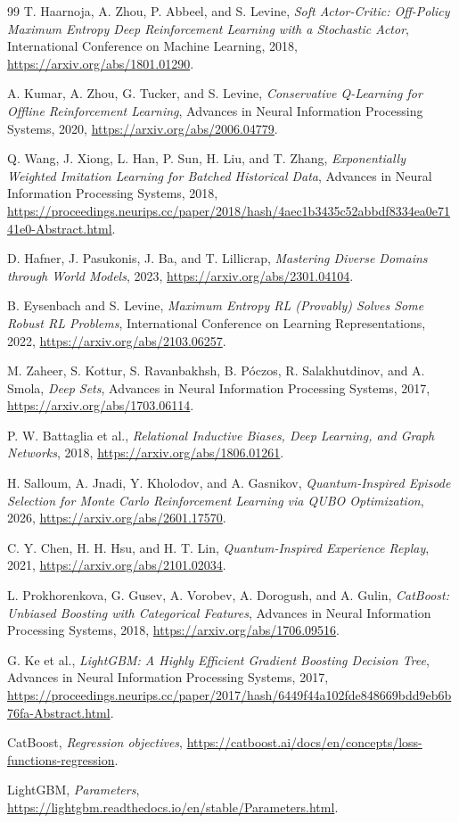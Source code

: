 \documentclass{strategynet-journal}
\begin{document}
\begin{thebibliography}{99}
T. Haarnoja, A. Zhou, P. Abbeel, and S. Levine,
\emph{Soft Actor-Critic: Off-Policy Maximum Entropy Deep Reinforcement
Learning with a Stochastic Actor},
International Conference on Machine Learning, 2018,
\url{https://arxiv.org/abs/1801.01290}.

A. Kumar, A. Zhou, G. Tucker, and S. Levine,
\emph{Conservative Q-Learning for Offline Reinforcement Learning},
Advances in Neural Information Processing Systems, 2020,
\url{https://arxiv.org/abs/2006.04779}.

Q. Wang, J. Xiong, L. Han, P. Sun, H. Liu, and T. Zhang,
\emph{Exponentially Weighted Imitation Learning for Batched Historical Data},
Advances in Neural Information Processing Systems, 2018,
\url{https://proceedings.neurips.cc/paper/2018/hash/4aec1b3435c52abbdf8334ea0e7141e0-Abstract.html}.

D. Hafner, J. Pasukonis, J. Ba, and T. Lillicrap,
\emph{Mastering Diverse Domains through World Models}, 2023,
\url{https://arxiv.org/abs/2301.04104}.

B. Eysenbach and S. Levine,
\emph{Maximum Entropy RL (Provably) Solves Some Robust RL Problems},
International Conference on Learning Representations, 2022,
\url{https://arxiv.org/abs/2103.06257}.

M. Zaheer, S. Kottur, S. Ravanbakhsh, B. P\'oczos, R. Salakhutdinov, and
A. Smola,
\emph{Deep Sets},
Advances in Neural Information Processing Systems, 2017,
\url{https://arxiv.org/abs/1703.06114}.

P. W. Battaglia et al.,
\emph{Relational Inductive Biases, Deep Learning, and Graph Networks}, 2018,
\url{https://arxiv.org/abs/1806.01261}.

H. Salloum, A. Jnadi, Y. Kholodov, and A. Gasnikov,
\emph{Quantum-Inspired Episode Selection for Monte Carlo Reinforcement
Learning via QUBO Optimization}, 2026,
\url{https://arxiv.org/abs/2601.17570}.

C. Y. Chen, H. H. Hsu, and H. T. Lin,
\emph{Quantum-Inspired Experience Replay}, 2021,
\url{https://arxiv.org/abs/2101.02034}.

L. Prokhorenkova, G. Gusev, A. Vorobev, A. Dorogush, and A. Gulin,
\emph{CatBoost: Unbiased Boosting with Categorical Features},
Advances in Neural Information Processing Systems, 2018,
\url{https://arxiv.org/abs/1706.09516}.

G. Ke et al.,
\emph{LightGBM: A Highly Efficient Gradient Boosting Decision Tree},
Advances in Neural Information Processing Systems, 2017,
\url{https://proceedings.neurips.cc/paper/2017/hash/6449f44a102fde848669bdd9eb6b76fa-Abstract.html}.

CatBoost,
\emph{Regression objectives},
\url{https://catboost.ai/docs/en/concepts/loss-functions-regression}.

LightGBM,
\emph{Parameters},
\url{https://lightgbm.readthedocs.io/en/stable/Parameters.html}.

\end{thebibliography}
\end{document}
